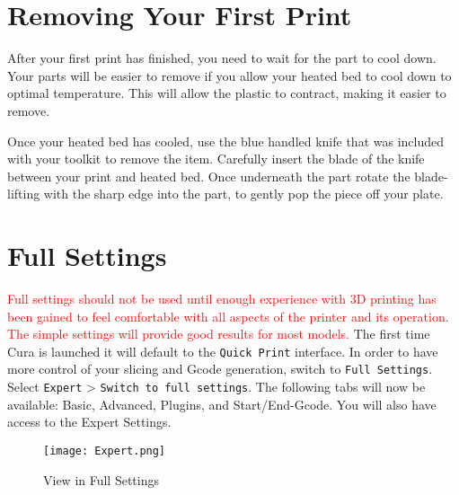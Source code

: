 \section{Removing Your First Print}
After your first print has finished, you need to wait for the part to cool down.  Your parts will be easier to remove if you allow your heated bed to cool down to optimal temperature. This will allow the plastic to contract, making it easier to remove. 

Once your heated bed has cooled, use the blue handled knife that was included with your toolkit to remove the item. Carefully insert the blade of the knife between your print and heated bed. Once underneath the part rotate the blade- lifting with the sharp edge into the part, to gently pop the piece off your plate.

\section{Full Settings}
\textcolor{red}{Full settings should not be used until enough experience with 3D printing has been gained to feel comfortable with all aspects of the printer and its operation. The simple settings will provide good results for most models.}
The first time Cura is launched it will default to the \texttt{Quick Print} interface. In order to have more control of your slicing and Gcode generation, switch to \texttt{Full Settings}. Select \texttt{Expert} > \texttt{Switch to full settings}. The following tabs will now be available: Basic, Advanced, Plugins, and Start/End-Gcode. You will also have access to the Expert Settings. 
\begin{figure}[H]
\centering
\texttt{[image: Expert.png]}
\caption{View in Full Settings}
\label{fig:Full Settings View}
\end{figure}


